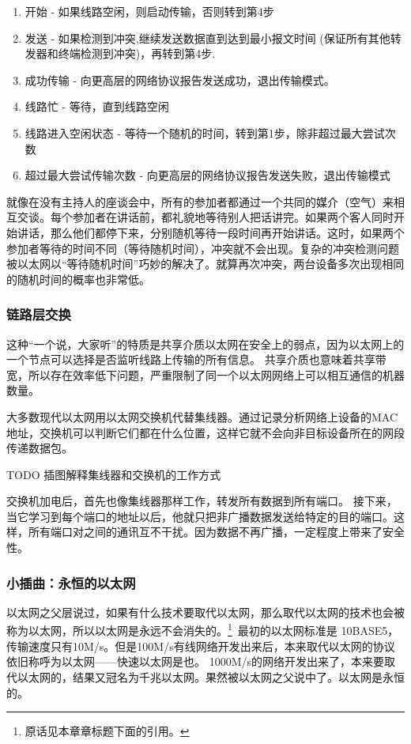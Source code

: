 \begin{enumerate}
\item     开始 - 如果线路空闲，则启动传输，否则转到第4步
\item     发送 - 如果检测到冲突,继续发送数据直到达到最小报文时间 (保证所有其他转发器和终端检测到冲突)，再转到第4步.
\item     成功传输 - 向更高层的网络协议报告发送成功，退出传输模式。
\item     线路忙 - 等待，直到线路空闲
\item     线路进入空闲状态 - 等待一个随机的时间，转到第1步，除非超过最大尝试次数
\item     超过最大尝试传输次数 - 向更高层的网络协议报告发送失败，退出传输模式
\end{enumerate}

就像在没有主持人的座谈会中，所有的参加者都通过一个共同的媒介（空气）来相互交谈。每个参加者在讲话前，都礼貌地等待别人把话讲完。如果两个客人同时开始讲话，那么他们都停下来，分别随机等待一段时间再开始讲话。这时，如果两个参加者等待的时间不同（等待随机时间），冲突就不会出现。复杂的冲突检测问题被以太网以“等待随机时间”巧妙的解决了。就算再次冲突，两台设备多次出现相同的随机时间的概率也非常低。

\subsubsection*{链路层交换}

这种“一个说，大家听”的特质是共享介质以太网在安全上的弱点，因为以太网上的一个节点可以选择是否监听线路上传输的所有信息。
共享介质也意味着共享带宽，所以存在效率低下问题，严重限制了同一个以太网网络上可以相互通信的机器数量。

大多数现代以太网用以太网交换机代替集线器。通过记录分析网络上设备的MAC地址，交换机可以判断它们都在什么位置，这样它就不会向非目标设备所在的网段传递数据包。

TODO 插图解释集线器和交换机的工作方式 %

交换机加电后，首先也像集线器那样工作，转发所有数据到所有端口。
接下来，当它学习到每个端口的地址以后，他就只把非广播数据发送给特定的目的端口。这样，所有端口对之间的通讯互不干扰。因为数据不再广播，一定程度上带来了安全性。


\subsubsection*{小插曲：永恒的以太网}
以太网之父层说过，如果有什么技术要取代以太网，那么取代以太网的技术也会被称为以太网，所以以太网是永远不会消失的。\hspace{-0.5em}\footnote{原话见本章章标题下面的引用。}~最初的以太网标准是 10BASE5， 传输速度只有10M/s。但是100M/s有线网络开发出来后，本来取代以太网的协议依旧称呼为以太网——快速以太网是也。
1000M/s的网络开发出来了，本来要取代以太网的，结果又冠名为千兆以太网。果然被以太网之父说中了。以太网是永恒的。

